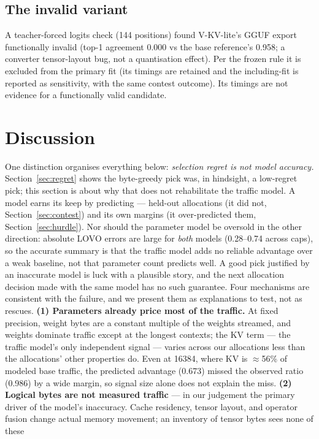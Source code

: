 \documentclass[11pt]{article}
\begin{document}
\subsection{The invalid variant}
\label{sec:kv}
A teacher-forced logits check (144 positions) found V-KV-lite's
GGUF export functionally invalid (top-1 agreement 0.000 vs the
base reference's 0.958; a converter tensor-layout bug, not a
quantisation effect). Per the frozen rule it is excluded from the
primary fit (its timings are retained and the including-fit is
reported as sensitivity, with the same contest outcome). Its
timings are not evidence for a functionally valid candidate.

\section{Discussion}
One distinction organises everything below: \emph{selection
regret is not model accuracy.} Section~\ref{sec:regret} shows the
byte-greedy pick was, in hindsight, a low-regret pick; this
section is about why that does not rehabilitate the traffic
model. A model earns its keep by predicting --- held-out
allocations (it did not, Section~\ref{sec:contest}) and its own
margins (it over-predicted them, Section~\ref{sec:hurdle}).
Nor should the parameter model be oversold in the other
direction: absolute LOVO errors are large for \emph{both} models
(0.28--0.74 across caps), so the accurate summary is that the
traffic model adds no reliable advantage over a weak baseline,
not that parameter count predicts well. A
good pick justified by an inaccurate model is luck with a
plausible story, and the next allocation decision made with the
same model has no such guarantee. Four mechanisms are consistent
with the failure, and we present them as explanations to test,
not as rescues.
\textbf{(1) Parameters already price most of the traffic.} At
fixed precision, weight bytes are a constant multiple of the
weights streamed, and weights dominate traffic except at the
longest contexts; the KV term --- the traffic model's only
independent signal --- varies across our allocations less than
the allocations' other properties do. Even at 16384, where KV is
$\approx$56\% of modeled base traffic, the predicted advantage
(0.673) missed the observed ratio (0.986) by a wide margin, so
signal size alone does not explain the miss.
\textbf{(2) Logical bytes are not measured traffic} --- in our
judgement the primary driver of the model's inaccuracy. Cache
residency, tensor layout, and operator fusion change actual
memory movement; an inventory of tensor bytes sees none of these
\end{document}
